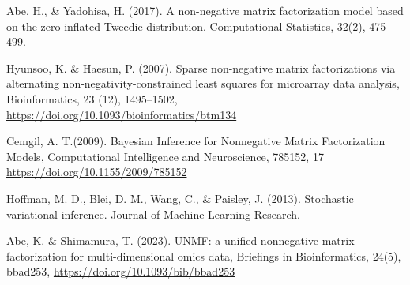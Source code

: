 \documentclass[paper=a4,10.5pt]{jsarticle} %
\numberwithin{equation}{section} %
\begin{document}
\begin{thebibliography}{9}
\item{} Abe, H., \& Yadohisa, H. (2017). A non-negative matrix factorization model based on the zero-inflated Tweedie distribution. Computational Statistics, 32(2), 475-499.
\item{}Hyunsoo, K. \&  Haesun, P. (2007). Sparse non-negative matrix factorizations via alternating non-negativity-constrained least squares for microarray data analysis, Bioinformatics,  23 (12), 1495--1502, \url{https://doi.org/10.1093/bioinformatics/btm134}
\item{} Cemgil, A. T.(2009). Bayesian Inference for Nonnegative Matrix Factorization Models, Computational Intelligence and Neuroscience, 785152, 17 \url{https://doi.org/10.1155/2009/785152}
\item{} Hoffman, M. D., Blei, D. M., Wang, C., \& Paisley, J. (2013). Stochastic variational inference. Journal of Machine Learning Research.
\item{} Abe, K. \& Shimamura, T. (2023). UNMF: a unified nonnegative matrix factorization for multi-dimensional omics data, Briefings in Bioinformatics, 24(5), bbad253, \url{https://doi.org/10.1093/bib/bbad253}
\end{thebibliography}
\end{document}
